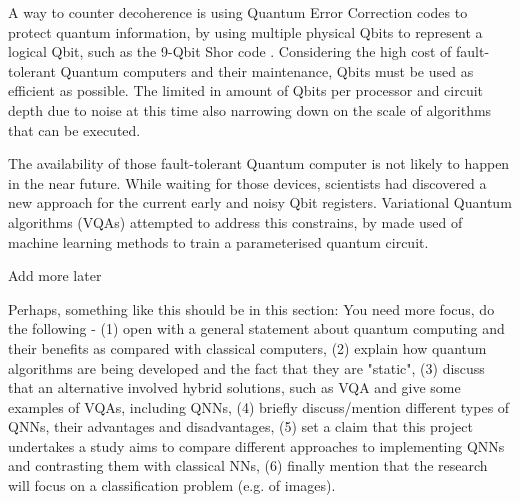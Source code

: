 A way to counter decoherence is using Quantum Error Correction codes \cite{lidar2013quantum} to protect quantum information, by using multiple physical Qbits to represent a logical Qbit, such as the 9-Qbit Shor code \cite{shor1995scheme}.
Considering the high cost of fault-tolerant Quantum computers and their maintenance, Qbits must be used as efficient as possible. 
The limited in amount of Qbits per processor and circuit depth due to noise at this time also narrowing down on the scale of algorithms that can be executed.

The availability of those fault-tolerant Quantum computer is not likely to happen in the near future. 
While waiting for those devices, scientists had discovered a new approach for the current early and noisy Qbit registers.
Variational Quantum algorithms (VQAs) \cite{cerezo2021variational} attempted to address this constrains, by made used of machine learning methods to train a parameterised quantum circuit.
\begin{center}
    \vspace{10pt}
    Add more later
    \vspace{10pt} 
\end{center}
Perhaps, something like this should be in this section: You need more focus, do the following - (1) open with a general statement about quantum computing and their benefits as compared with classical computers, (2) explain how quantum algorithms are being developed and the fact that they are "static", (3) discuss that an alternative involved hybrid solutions, such as VQA and give some examples of VQAs, including QNNs, (4) briefly discuss/mention different types of QNNs, their advantages and disadvantages, (5) set a claim that this project undertakes a study aims to compare different approaches to implementing QNNs and contrasting them with classical NNs, (6) finally mention that the research will focus on a classification problem (e.g. of images).

